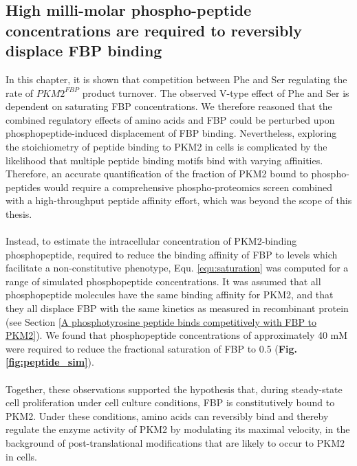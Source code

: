 \subsection{High milli-molar phospho-peptide concentrations are required to reversibly displace FBP binding}
\label{subsec:pm2tide_kinetics}
In this chapter, it is shown that competition between Phe and Ser regulating the rate of $PKM2^{FBP}$ product turnover. The observed V-type effect of Phe and Ser is dependent on saturating FBP concentrations. We therefore reasoned that the combined regulatory effects of amino acids and FBP could be perturbed upon phosphopeptide-induced displacement of FBP binding. Nevertheless, exploring the stoichiometry of peptide binding to PKM2 in cells is complicated by the likelihood that multiple peptide binding motifs bind with varying affinities. Therefore, an accurate quantification of the fraction of PKM2 bound to phospho-peptides would require a comprehensive phospho-proteomics screen combined with a high-throughput peptide affinity effort, which was beyond the scope of this thesis. 
%
%
\\\\
%
%
Instead, to estimate the intracellular concentration of PKM2-binding phosphopeptide, required to reduce the binding affinity of FBP to levels which facilitate a non-constitutive phenotype, Equ. \ref{equ:saturation} was computed for a range of simulated phosphopeptide concentrations. It was assumed that all phosphopeptide molecules have the same binding affinity for PKM2, and that they all displace FBP with the same kinetics as measured in recombinant protein (see Section \ref{A phosphotyrosine peptide binds competitively with FBP to PKM2}). We found that phosphopeptide concentrations of approximately 40 mM were required to reduce the fractional saturation of FBP to 0.5 (\textbf{Fig. \ref{fig:peptide_sim}}).
%
%
\\\\
%
%
Together, these observations supported the hypothesis that, during steady-state cell proliferation under cell culture conditions, FBP is constitutively bound to PKM2. Under these conditions, amino acids can reversibly bind and thereby regulate the enzyme activity of PKM2 by modulating its maximal velocity, in the background of post-translational modifications that are likely to occur to PKM2 in cells.
%
%
%
%
